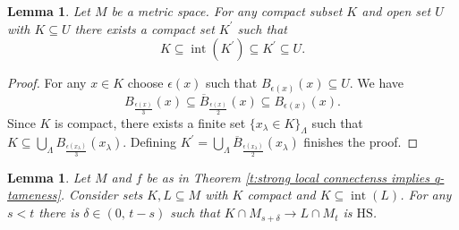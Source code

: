 \documentclass{amsart}
\newtheorem{lemma}[theorem]{Lemma}
\theoremstyle{definition}
\newcommand{\HS}{\mathrm{HS}}
\DeclareMathOperator{\interior}{int}
\begin{document}
\begin{lemma} \label{l:neighborhood third}
	Let $M$ be a metric space. For any compact subset $K$ and open set $U$ with $K \subseteq U$ there exists a compact set $K^\prime$ such that
	\begin{equation*}
	K \subseteq \interior(K^\prime) \subseteq K^\prime \subseteq U.
	\end{equation*}
\end{lemma}

\begin{proof}
	For any $x \in K$ choose $\epsilon(x)$ such that $B_{\epsilon(x)}(x) \subseteq U$. We have
	\begin{equation*}
	B_{\frac{\epsilon(x)}{3}}(x) \subseteq \overline B_{\frac{\epsilon(x)}{2}}(x) \subseteq B_{\epsilon(x)}(x).
	\end{equation*}
	Since $K$ is compact, there exists a finite set $\{x_\lambda \in K\}_{\Lambda}$ such that $K \subseteq \bigcup_{\Lambda} B_{\frac{\epsilon(x_\lambda)}{3}}(x_\lambda)$. Defining $K^\prime = \bigcup_{\Lambda} \overline B_{\frac{\epsilon(x_\lambda)}{2}}(x_\lambda)$ finishes the proof.
\end{proof}

\begin{lemma} \label{l:key lemma for q-tameness}
	Let $M$ and $f$ be as in Theorem \ref{t:strong local connectenss implies q-tameness}.
	Consider sets $K, L \subseteq M$ with $K$ compact and $K \subseteq \interior(L)$. For any $s < t$ there is $\delta \in (0,\, t-s)$ such that $K \cap M_{s+\delta} \to L \cap M_{t}$ is $\HS$.
\end{lemma}
\end{document}
